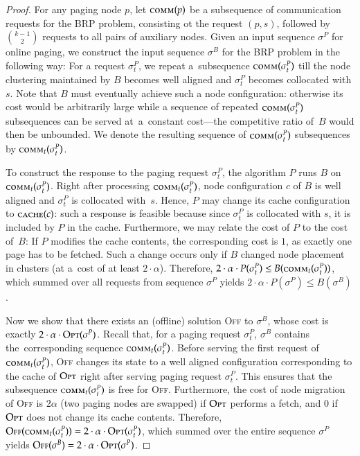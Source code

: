 \documentclass[11pt,a4paper]{scrartcl}
\newcommand{\OFF}{\textsc{Off}\xspace}
\newcommand{\OPT}{\textsc{Opt}\xspace}
\newcommand{\comm}{\textsc{comm}}
\begin{document}
\begin{proof}
For any paging node $p$, let $\comm(p)$ be a subsequence of communication
requests for the BRP problem, consisting ot the request $(p, s)$, followed by
$\binom{k-1}{2}$ requests to all pairs of auxiliary nodes. Given an input
sequence $\sigma^P$ for online paging, we construct the input sequence
$\sigma^B$ for the BRP problem in the following way: For a request
$\sigma^P_t$, we repeat a~subsequence $\comm(\sigma^P_t)$ till the node
clustering maintained by $B$ becomes well aligned and $\sigma^P_t$ becomes
collocated with $s$. Note that $B$ must eventually achieve such a node
configuration: otherwise its cost would be arbitrarily large while a sequence
of repeated $\comm(\sigma^P_t)$ subsequences can be served at~a~constant
cost---the competitive ratio of~$B$ would then be unbounded. We denote the
resulting sequence of $\comm(\sigma^P_t)$ subsequences by
$\comm_t(\sigma^P_t)$.

To construct the response to the paging request $\sigma^P_t$, the algorithm
$P$ runs $B$ on $\comm_t(\sigma^P_t)$. Right after processing
$\comm_t(\sigma^P_t)$, node configuration $c$ of $B$ is well aligned and
$\sigma^P_t$ is collocated with~$s$. Hence, $P$ may change its cache
configuration to $\textsc{cache}(c)$: such a response is feasible because
since $\sigma^P_t$ is collocated with $s$, it is included by $P$ in the cache.
Furthermore, we may relate the cost of $P$ to the cost of~$B$: If $P$ modifies
the cache contents, the corresponding cost is $1$, as exactly one page has to
be fetched. Such a change occurs only if $B$ changed node placement in
clusters (at a~cost of at least $2 \cdot \alpha$). Therefore, $2
\cdot \alpha \cdot P(\sigma^P_t) \leq B(\comm_t(\sigma^P_t))$, which
summed over all requests from sequence $\sigma^P$ yields $2 \cdot
\alpha \cdot P(\sigma^P) \leq B(\sigma^B)$.

Now we show that there exists an (offline) solution \OFF to $\sigma^B$, whose
cost is exactly $2 \cdot \alpha \cdot \OPT(\sigma^P)$. Recall that, for a
paging request $\sigma^P_t$, $\sigma^B$ contains the~corresponding sequence
$\comm_t(\sigma^P_t)$. Before serving the first request
of~$\comm_t(\sigma^P_t)$, \OFF changes its state to a well aligned
configuration corresponding to the cache of $\OPT$ right after serving paging
request $\sigma^P_t$. This ensures that the subsequence $\comm_t(\sigma^P_t)$
is free for \OFF. Furthermore, the cost of node migration of \OFF is $2
\alpha$ (two paging nodes are swapped) if $\OPT$ performs a fetch, and 0 if
$\OPT$ does not change its cache contents. Therefore,
$\OFF(\comm_t(\sigma^P_t)) = 2 \cdot \alpha \cdot \OPT(\sigma^P_t)$, which
summed over the entire sequence $\sigma^P$ yields $\OFF(\sigma^B) = 2 \cdot
\alpha \cdot \OPT(\sigma^P)$.


\end{proof}
\end{document}
